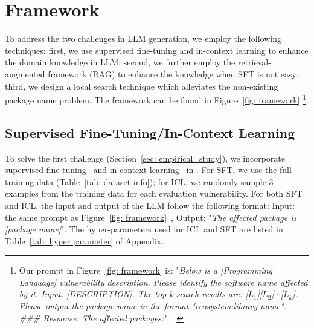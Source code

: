 

\section{\detector{} Framework}\label{sec:approach}

To address the two challenges in LLM generation, we employ the following techniques: first, we use supervised fine-tuning and in-context learning to enhance the domain knowledge in LLM; second, we further employ the retrieval-augmented framework (RAG) to enhance the knowledge when SFT is not easy; third, we design a local search technique which alleviates the non-existing package name problem. The \detector{} framework can be found in Figure~\ref{fig: framework} \footnote{Our prompt in Figure~\ref{fig: framework} is: "\emph{Below is a [Programming Language] vulnerability description. Please identify the software name affected by it. Input: [DESCRIPTION]. The top k search results are: [$L_1$][$L_2$]$\cdots$[$L_k$]. Please output the package name in the format "ecosystem:library name".
\#\#\# Response: The affected packages:}". ~\label{fn: input}}.

\subsection{Supervised Fine-Tuning/In-Context Learning}

To solve the first challenge (Section~\ref{sec: empirical_study}), we incorporate supervised fine-tuning~\cite{prottasha2022transfer, church2021emerging} and in-context learning~\cite{dong2022survey, olsson2022context} in \detector{}. For SFT, we use the full training data (Table~\ref{tab: dataset info}); for ICL, we randomly sample 3 examples from the training data for each evaluation vulnerability. For both SFT and ICL, the input and output of the LLM follow the following format: Input: the same prompt as Figure~\ref{fig: framework}~, Output: "\emph{The affected package is [package name]}". The hyper-parameters used for ICL and SFT are listed in Table~\ref{tab: hyper parameter} of Appendix.


